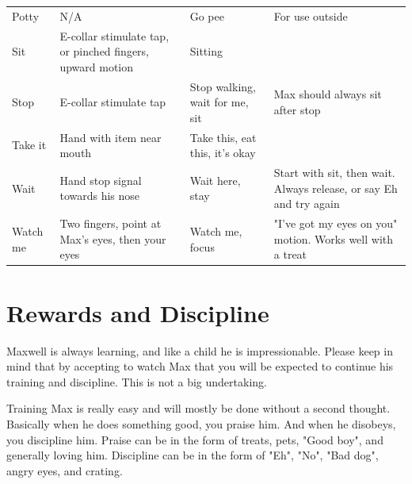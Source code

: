 \documentclass[pdftex,12pt]{article}
\begin{document}
\begin{table}[H]
\begin{adjustwidth}{-4.5cm}{-4.5cm}
\begin{center}
\begin{tabular}{lp{}p{}p{}}
                Potty       & N/A                                              & Go pee                                & For use outside                                                    \\
                Sit         & E-collar stimulate tap, or pinched fingers, upward motion                   & Sitting                                               &                                                                    \\
                Stop        & E-collar stimulate tap
                & Stop walking, wait for me, sit                        & Max
                should always sit after stop \\
                Take it     & Hand with item near mouth                        & Take this, eat this, it's okay                        &                                                                    \\
                Wait        & Hand stop signal towards his nose                & Wait here, stay                                       & Start with sit, then wait. Always release, or say Eh and try again \\
                Watch me    & Two fingers, point at Max's eyes, then your eyes & Watch me, focus                                       & "I've got my eyes on you" motion. Works well with a treat
            \end{tabular}
            \egroup
        \end{center}
    \end{adjustwidth}
\end{table}

\newpage
\section{Rewards and Discipline}

Maxwell is always learning, and like a child he is impressionable. Please keep
in mind that by accepting to watch Max that you will be expected to continue his
training and discipline. This is not a big undertaking.

\bigskip

Training Max is really easy and will mostly be done without a second thought.
Basically when he does something good, you praise him. And when he disobeys, you
discipline him. Praise can be in the form of treats, pets, "Good boy", and
generally loving him. Discipline can be in the form of "Eh", "No", "Bad dog",
angry eyes, and crating.
\end{document}
